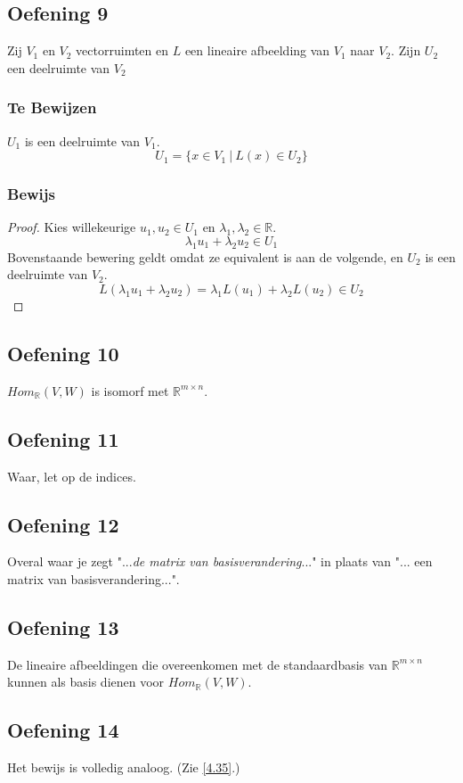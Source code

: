 \documentclass[lineaire_algebra_oplossingen.tex]{subfiles}
\begin{document}
\subsection{Oefening 9}
Zij $V_1$ en $V_2$ vectorruimten en $L$ een lineaire afbeelding van $V_1$ naar $V_2$. Zijn $U_2$ een deelruimte van $V_2$

\subsubsection*{Te Bewijzen}
$U_1$ is een deelruimte van $V_1$.
\[
U_1 = \{x \in V_1\ |\  L(x) \in U_2 \}
\]

\subsubsection*{Bewijs}
\begin{proof}
Kies willekeurige $u_1, u_2 \in U_1$ en $\lambda_1,\lambda_2 \in \mathbb{R}$.
\[
\lambda_1u_1 + \lambda_2u_2 \in U_1
\]
Bovenstaande bewering geldt omdat ze equivalent is aan de volgende, en $U_2$ is een deelruimte van $V_2$.
\[
L(\lambda_1u_1 + \lambda_2u_2)
=\lambda_1L(u_1) + \lambda_2L(u_2)
 \in U_2
\]
\end{proof}

\subsection{Oefening 10}
$Hom_{\mathbb{R}}(V,W)$ is isomorf met $\mathbb{R}^{m\times n}$.

\subsection{Oefening 11}
Waar, let op de indices.

\subsection{Oefening 12}
Overal waar je zegt "...\emph{de matrix van basisverandering}..." in plaats van "... een matrix van basisverandering...".

\subsection{Oefening 13}
De lineaire afbeeldingen die overeenkomen met de standaardbasis van $\mathbb{R}^{m\times n}$ kunnen als basis dienen voor $Hom_\mathbb{R}(V,W)$.

\subsection{Oefening 14}
Het bewijs is volledig analoog. (Zie \ref{4.35}.)
\end{document}
